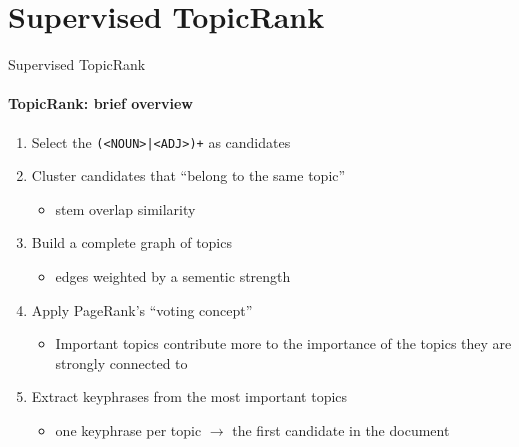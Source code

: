 \section{Supervised TopicRank}
  \begin{frame}{Supervised TopicRank}
    \framesubtitle{TopicRank: brief overview}

    \begin{enumerate}
      \item<+->{Select the \texttt{(<NOUN>|<ADJ>)+} as candidates}
      \item<+->{Cluster candidates that ``belong to the same topic''}
      \begin{itemize}
        \item{stem overlap similarity}
      \end{itemize}
      \item<+->{Build a complete graph of topics}
      \begin{itemize}
        \item{edges weighted by a sementic strength}
      \end{itemize}
      \item<+->{Apply PageRank's ``voting concept''}
      \begin{itemize}
        \item{Important topics contribute more to the importance of the topics
              they are strongly connected to}
      \end{itemize}
      \item<+->{Extract keyphrases from the most important topics}
      \begin{itemize}
        \item{one keyphrase per topic $\rightarrow$ the first candidate in the document}
      \end{itemize}
    \end{enumerate}
  \end{frame}

